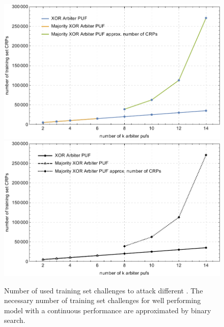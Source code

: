 
\begin{figure}[ht]
\ifx{}\undefined
{}
\else
	\if{}
	\centering
	\includegraphics[width=1.00\textwidth]{images/xor-cma-attack-crps.pdf}
	\else
	\includegraphics[width=1.00\textwidth]{images/xor-cma-attack-crps_mono.pdf}
	\fi
\fi
\caption[Number of used training set challenges]{Number of used training set challenges to attack different \pufs. The necessary number of training set challenges for well performing model with a continuous performance are approximated by binary search.}
\label{fig:cmamultiattackrequiredcrp}
\end{figure}

